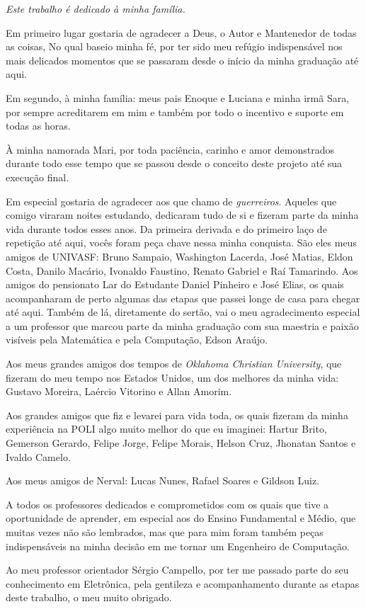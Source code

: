 \documentclass[
    12pt,               %
    openright,          %
    oneside,
    a4paper,            
    english,            %
    brazil              %
    ]{abntex2}
\begin{document}
\begin{dedicatoria}
   \vspace*{\fill}
   \centering
   \noindent
   \textit{ Este trabalho é dedicado à minha família.} \vspace*{\fill}
\end{dedicatoria}

\begin{agradecimentos}
Em primeiro lugar gostaria de agradecer a Deus, o Autor e Mantenedor de todas as coisas, No qual baseio minha fé, por ter sido meu refúgio indispensável nos mais delicados momentos que se passaram desde o início da minha graduação até aqui. 

Em segundo, à minha família: meus pais Enoque e Luciana e minha irmã Sara, por sempre acreditarem em mim e também por todo o incentivo e suporte em todas as horas.

À minha namorada Mari, por toda paciência, carinho e amor demonstrados durante todo esse tempo que se passou desde o conceito deste projeto até sua execução final.

Em especial gostaria de agradecer aos que chamo de \textit{guerreiros}. Aqueles que comigo viraram noites estudando, dedicaram tudo de si e fizeram parte da minha vida durante todos esses anos. Da primeira derivada e do primeiro laço de repetição até aqui, vocês foram peça chave nessa minha conquista. São eles meus amigos de UNIVASF: Bruno Sampaio, Washington Lacerda, José Matias, Eldon Costa, Danilo Macário, Ivonaldo Faustino, Renato Gabriel e Raí Tamarindo. Aos amigos do pensionato Lar do Estudante Daniel Pinheiro e José Elias, os quais acompanharam de perto algumas das etapas que passei longe de casa para chegar até aqui. Também de lá, diretamente do sertão, vai o meu agradecimento especial a um professor que marcou parte da minha graduação com sua maestria e paixão visíveis pela Matemática e pela Computação, Edson Araújo. 

Aos meus grandes amigos dos tempos de \textit{Oklahoma Christian University}, que fizeram do meu tempo nos Estados Unidos, um dos melhores da minha vida: Gustavo Moreira, Laércio Vitorino e Allan Amorim. 

Aos grandes amigos que fiz e levarei para vida toda, os quais fizeram da minha experiência na POLI algo muito melhor do que eu imaginei: Hartur Brito, Gemerson Gerardo, Felipe Jorge, Felipe Morais, Helson Cruz, Jhonatan Santos e Ivaldo Camelo. 

Aos meus amigos de Nerval: Lucas Nunes, Rafael Soares e Gildson Luiz. 

A todos os professores dedicados e comprometidos com os quais que tive a oportunidade de aprender, em especial aos do Ensino Fundamental e Médio, que muitas vezes não são lembrados, mas que para mim foram também peças indispensáveis na minha decisão em me tornar um Engenheiro de Computação. 

Ao meu professor orientador Sérgio Campello, por ter me passado parte do seu conhecimento em Eletrônica, pela gentileza e acompanhamento durante as etapas deste trabalho, o meu muito obrigado.


\end{agradecimentos}
\end{document}
